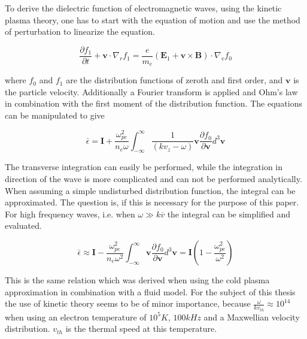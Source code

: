 \documentclass[two-column,ras]{agutex}
\begin{document}
\begin{article}
To derive the dielectric function of electromagnetic waves, using the kinetic plasma theory, one has to start with the equation of motion and use the method of perturbation to linearize the equation.

\begin{equation}\label{eq:vlasov_full_linearized}
\frac{\partial f_1}{\partial t} + \mathbf{v}\cdot
\nabla_r f_1=\frac{e}{m_e}\left( \mathbf{E}_1+\mathbf{v} \times \mathbf{B}\right) \cdot \nabla_v f_0
\end{equation}

where $f_0$ and $f_1$ are the distribution functions of zeroth and first order, and $\mathbf{v}$ is the particle velocity. Additionally a Fourier transform is applied and Ohm's law in combination with the first moment of the distribution function. The equations can be manipulated to give



\begin{equation}
\bar{\epsilon} =\mathbf{I} +  \frac{\omega_{pe}^2}{n_e  \omega}  \int_{-\infty}^{\infty} \frac{1}{ (k  v_z-\omega)}\mathbf{v} \frac{\partial f_0}{\partial \mathbf{v}} d^3 \mathbf{v}
\end{equation}

The transverse integration can easily be performed, while the integration in direction of the wave is more complicated and can not be performed analytically. When assuming a simple undisturbed distribution function, the integral can be approximated. The question is, if this is necessary for the purpose of this paper. \\

For high frequency waves, i.e. when $\omega \gg k\overline{v}$ the integral can be simplified and evaluated.

\begin{equation}
\bar{\epsilon} \approx \mathbf{I} -  \frac{\omega_{pe}^2}{n_e  \omega^2}  \int_{-\infty}^{\infty} \mathbf{v} \frac{\partial f_0}{\partial \mathbf{v}} d^3 \mathbf{v}=\mathbf{I}\left( 1 -  \frac{\omega_{pe}^2}{  \omega^2}\right)
\end{equation}

This is the same relation which was derived when using the cold plasma approximation in combination with a fluid model. For the subject of this thesis the use of kinetic theory seems to be of minor importance, because $\frac{\omega}{kv_{th}}\approx 10^{14}$ when using an electron temperature of $10^5K$, $100kHz$ and a Maxwellian velocity distribution. $v_{th}$ is the thermal speed at this temperature. \\


\end{article}
\end{document}
